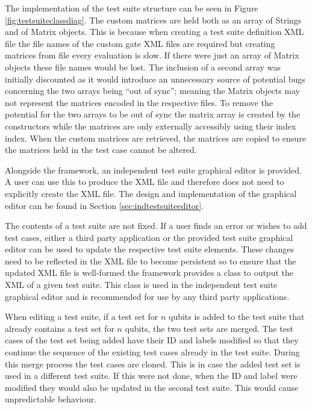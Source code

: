 The implementation of the test suite structure can be seen in Figure \ref{fig:testsuiteclassdiag}.
The custom matrices are held both as an array of Strings and of Matrix objects.
This is because when creating a test suite definition XML file the file names of the custom gate XML files are required but creating matrices from file every evaluation is slow.
If there were just an array of Matrix objects these file names would be lost.
The inclusion of a second array was initially discounted as it would introduce an unnecessary source of potential bugs concerning the two arrays being ``out of sync''; meaning the Matrix objects may not represent the matrices encoded in the respective files.
To remove the potential for the two arrays to be out of sync the matrix array is created by the constructors while the matrices are only externally accessibly using their index index.
When the custom matrices are retrieved, the matrices are copied to ensure the matrices held in the test case cannot be altered.

Alongside the framework, an independent test suite graphical editor is provided.
A user can use this to produce the XML file and therefore does not need to explicitly create the XML file.
The design and implementation of the graphical editor can be found in Section \ref{sec:indtestsuiteeditor}.

The contents of a test suite are not fixed.
If a user finds an error or wishes to add test cases, either a third party application or the provided test suite graphical editor can be used to update the respective test suite elements.
These changes need to be reflected in the XML file to become persistent so to ensure that the updated XML file is well-formed the framework provides a class to output the XML of a given test suite.
This class is used in the independent test suite graphical editor and is recommended for use by any third party applications.

When editing a test suite, if a test set for $n$ qubits is added to the test suite that already contains a test set for $n$ qubits, the two test sets are merged.
The test cases of the test set being added have their ID and labels modified so that they continue the sequence of the existing test cases already in the test suite.
During this merge process the test cases are cloned.
This is in case the added test set is used in a different test suite.
If this were not done, when the ID and label were modified they would also be updated in the second test suite.
This would cause unpredictable behaviour.

